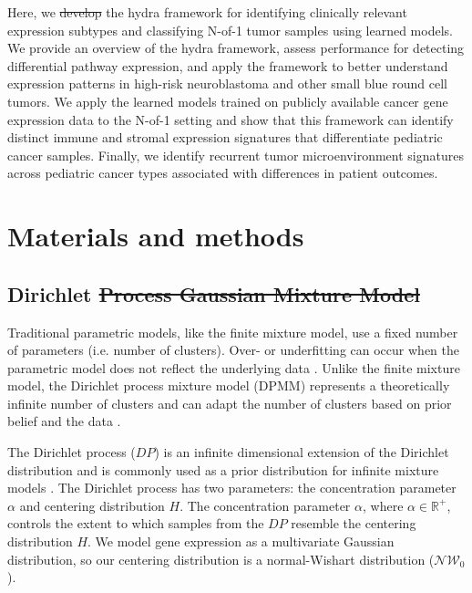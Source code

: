 \documentclass[10pt,letterpaper]{article}
\providecommand{\DIFaddtex}[1]{{\protect\color{blue}\uwave{#1}}} %
\providecommand{\DIFdeltex}[1]{{\protect\color{red}\sout{#1}}}                      %
\providecommand{\DIFaddbegin}{} %
\providecommand{\DIFaddend}{} %
\providecommand{\DIFdelbegin}{} %
\providecommand{\DIFdelend}{} %
\providecommand{\DIFadd}[1]{\texorpdfstring{\DIFaddtex{#1}}{#1}} %
\providecommand{\DIFdel}[1]{\texorpdfstring{\DIFdeltex{#1}}{}} %
\newcommand{\DIFscaledelfig}{0.5}
\newlength{\DIFdelgraphicswidth} %
\newlength{\DIFdelgraphicsheight} %
\newcommand{\DIFaddincludegraphics}[2][]{{\color{blue}\fbox{\DIFOincludegraphics[#1]{#2}}}} %
\newcommand{\DIFdelincludegraphics}[2][]{%
\sbox{\DIFdelgraphicsbox}{\DIFOincludegraphics[#1]{#2}}%
\settoboxwidth{\DIFdelgraphicswidth}{\DIFdelgraphicsbox} %
\settoboxtotalheight{\DIFdelgraphicsheight}{\DIFdelgraphicsbox} %
\scalebox{\DIFscaledelfig}{%
\parbox[b]{\DIFdelgraphicswidth}{\usebox{\DIFdelgraphicsbox}\\[-\baselineskip] \rule{\DIFdelgraphicswidth}{0em}}\llap{\resizebox{\DIFdelgraphicswidth}{\DIFdelgraphicsheight}{%
\setlength{\unitlength}{\DIFdelgraphicswidth}%
\begin{picture}(1,1)%
\thicklines\linethickness{2pt} %
{\color[rgb]{1,0,0}\put(0,0){\framebox(1,1){}}}%
{\color[rgb]{1,0,0}\put(0,0){\line( 1,1){1}}}%
{\color[rgb]{1,0,0}\put(0,1){\line(1,-1){1}}}%
\end{picture}%
}\hspace*{3pt}}} %
} %
\DeclareRobustCommand{\DIFaddbegin}{\DIFOaddbegin \let\includegraphics\DIFaddincludegraphics} %
\DeclareRobustCommand{\DIFaddend}{\DIFOaddend \let\includegraphics\DIFOincludegraphics} %
\DeclareRobustCommand{\DIFdelbegin}{\DIFOdelbegin \let\includegraphics\DIFdelincludegraphics} %
\DeclareRobustCommand{\DIFdelend}{\DIFOaddend \let\includegraphics\DIFOincludegraphics} %
\begin{document}
Here, we \DIFdelbegin \DIFdel{develop }\DIFdelend \DIFaddbegin \DIFadd{present }\DIFaddend the hydra framework for identifying clinically relevant expression subtypes and classifying N-of-1 tumor samples using learned models. We provide an overview of the hydra framework, assess performance for detecting differential pathway expression, and apply the framework to better understand expression patterns in high-risk neuroblastoma and other small blue round cell tumors. We apply the learned models trained on publicly available cancer gene expression data to the N-of-1 setting and show that this framework can identify distinct immune and stromal expression signatures that differentiate pediatric cancer samples. Finally, we identify recurrent tumor microenvironment signatures across pediatric cancer types associated with differences in patient outcomes.

\section*{Materials and methods}
\subsection*{Dirichlet \DIFdelbegin \DIFdel{Process Gaussian Mixture Model}\DIFdelend \DIFaddbegin \DIFadd{process gaussian mixture model}\DIFaddend }
\DIFdelbegin %

\DIFdelend Traditional parametric models, like the finite mixture model, use a fixed number of parameters (i.e. number of clusters). Over- or underfitting can occur when the parametric model does not reflect the underlying data \cite{teh2010dirichlet}. Unlike the finite mixture model, the Dirichlet process mixture model (DPMM) represents a theoretically infinite number of clusters and can adapt the number of clusters based on prior belief and the data \cite{gelmanBayesianDataAnalysis2013, antoniakMixturesDirichletProcesses1974, teh2010dirichlet}.

The Dirichlet process ($DP$) is an infinite dimensional extension of the Dirichlet distribution \cite{fergusonBayesianAnalysisNonparametric1973} and is commonly used as a prior distribution for infinite mixture models \cite{muller2004nonparametric, gorurDirichletProcessGaussian2010}. The Dirichlet process has two parameters: the concentration parameter $\alpha$ and centering distribution $H$. The concentration parameter $\alpha$, where $\alpha \in \mathbb{R}^+$, controls the extent to which samples from the $DP$ resemble the centering distribution $H$. We model gene expression as a multivariate Gaussian distribution, so our centering distribution is a normal-Wishart distribution ($\mathcal{NW}_0$).
\end{document}
